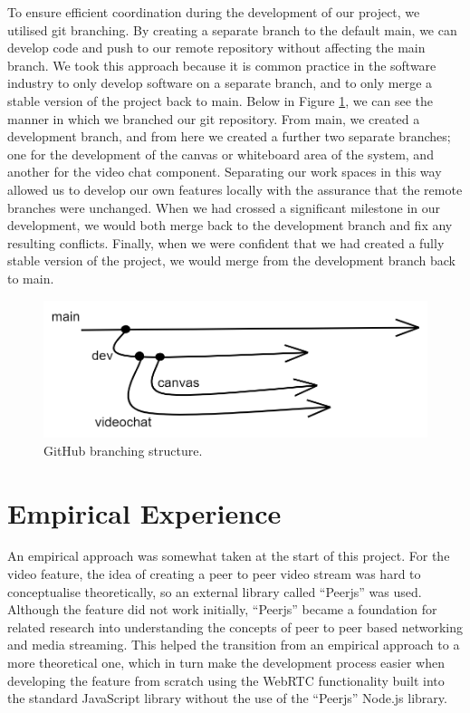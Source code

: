 To ensure efficient coordination during the development of our project, we utilised git branching. By creating a separate branch to the default main, we can develop code and push to our remote repository without affecting the main branch. We took this approach because it is common practice in the software industry to only develop software on a separate branch, and to only merge a stable version of the project back to main. 
Below in Figure \ref{branchingDiagram}, we can see the manner in which we branched our git repository. From main, we created a development branch, and from here we created a further two separate branches; one for the development of the canvas or whiteboard area of the system, and another for the video chat component. Separating our work spaces in this way allowed us to develop our own features locally with the assurance that the remote branches were unchanged. When we had crossed a significant milestone in our development, we would both merge back to the development branch and fix any resulting conflicts. Finally, when we were confident that we had created a fully stable version of the project, we would merge from the development branch back to main.   
\begin{figure}[H]
    \centering
    \includegraphics[scale=0.4]{img/flow-chart.png}
    \caption{GitHub branching structure.}
    \label{branchingDiagram}
\end{figure}

\section{Empirical Experience}
An empirical approach was somewhat taken at the start of this project. For the video feature, the idea of creating a peer to peer video stream was hard to conceptualise theoretically, so an external library called “Peerjs” was used. Although the feature did not work initially, “Peerjs” became a foundation for related research into understanding the concepts of peer to peer based networking and media streaming. This helped the transition from an empirical approach to a more theoretical one, which in turn make the development process easier when developing the feature from scratch using the WebRTC functionality built into the standard JavaScript library without the use of the “Peerjs” Node.js library.

